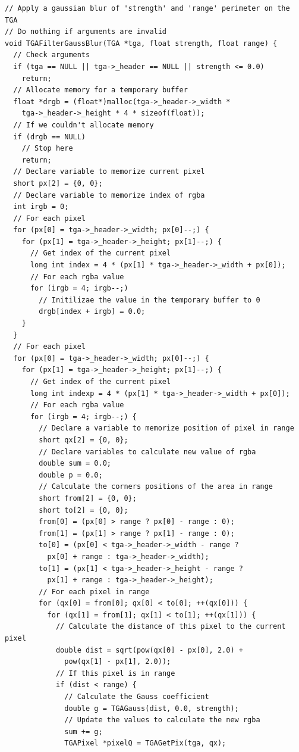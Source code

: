 \documentclass[12pt, a4paper]{article}
\begin{document}
\begin{scriptsize}
\begin{ttfamily}
\begin{lstlisting}
// Apply a gaussian blur of 'strength' and 'range' perimeter on the TGA
// Do nothing if arguments are invalid 
void TGAFilterGaussBlur(TGA *tga, float strength, float range) {
  // Check arguments
  if (tga == NULL || tga->_header == NULL || strength <= 0.0)
    return;
  // Allocate memory for a temporary buffer
  float *drgb = (float*)malloc(tga->_header->_width *
    tga->_header->_height * 4 * sizeof(float));
  // If we couldn't allocate memory
  if (drgb == NULL)
    // Stop here
    return;
  // Declare variable to memorize current pixel
  short px[2] = {0, 0};
  // Declare variable to memorize index of rgba
  int irgb = 0;
  // For each pixel
  for (px[0] = tga->_header->_width; px[0]--;) {
    for (px[1] = tga->_header->_height; px[1]--;) {
      // Get index of the current pixel
      long int index = 4 * (px[1] * tga->_header->_width + px[0]);
      // For each rgba value
      for (irgb = 4; irgb--;)
        // Initilizae the value in the temporary buffer to 0
        drgb[index + irgb] = 0.0;
    }
  }
  // For each pixel
  for (px[0] = tga->_header->_width; px[0]--;) {
    for (px[1] = tga->_header->_height; px[1]--;) {
      // Get index of the current pixel
      long int indexp = 4 * (px[1] * tga->_header->_width + px[0]);
      // For each rgba value
      for (irgb = 4; irgb--;) {
        // Declare a variable to memorize position of pixel in range
        short qx[2] = {0, 0};
        // Declare variables to calculate new value of rgba
        double sum = 0.0;
        double p = 0.0;
        // Calculate the corners positions of the area in range
        short from[2] = {0, 0};
        short to[2] = {0, 0};
        from[0] = (px[0] > range ? px[0] - range : 0);
        from[1] = (px[1] > range ? px[1] - range : 0);
        to[0] = (px[0] < tga->_header->_width - range ? 
          px[0] + range : tga->_header->_width);
        to[1] = (px[1] < tga->_header->_height - range ? 
          px[1] + range : tga->_header->_height);
        // For each pixel in range
        for (qx[0] = from[0]; qx[0] < to[0]; ++(qx[0])) {
          for (qx[1] = from[1]; qx[1] < to[1]; ++(qx[1])) {
            // Calculate the distance of this pixel to the current pixel
            double dist = sqrt(pow(qx[0] - px[0], 2.0) + 
              pow(qx[1] - px[1], 2.0));
            // If this pixel is in range
            if (dist < range) {
              // Calculate the Gauss coefficient
              double g = TGAGauss(dist, 0.0, strength);
              // Update the values to calculate the new rgba
              sum += g;
              TGAPixel *pixelQ = TGAGetPix(tga, qx);

\end{lstlisting}
\end{ttfamily}
\end{scriptsize}
\end{document}
